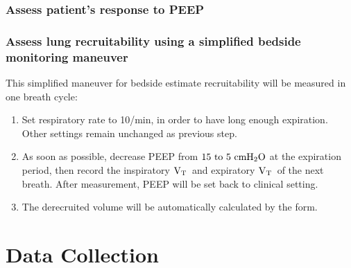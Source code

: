 \documentclass[11pt]{article} %
\def\Vt{$\rm{V_T}$}
\def\Pes{$\rm{P_{es}}$}
\def\Pplat{$\rm{P_{plat}}$}
\begin{document}
\subsubsection{Assess patient's response to PEEP}


\subsubsection{Assess lung recruitability using a simplified bedside monitoring maneuver}
This simplified maneuver for bedside estimate recruitability will be measured in one breath cycle\parencite{Dellamonica2011}:
\begin{enumerate}[label=(\alph*)]
\item	Set respiratory rate to 10/min, in order to have long enough expiration. Other settings remain unchanged as previous step.
\item	As soon as possible, decrease PEEP from $\rm{15~to~5~cmH_2O}$ at the expiration period, then record the inspiratory \Vt~and expiratory \Vt~of the next breath. After measurement, PEEP will be set back to clinical setting.
\item	The derecruited volume will be automatically calculated by the form.
\end{enumerate}





\section{Data Collection}
\end{document}

